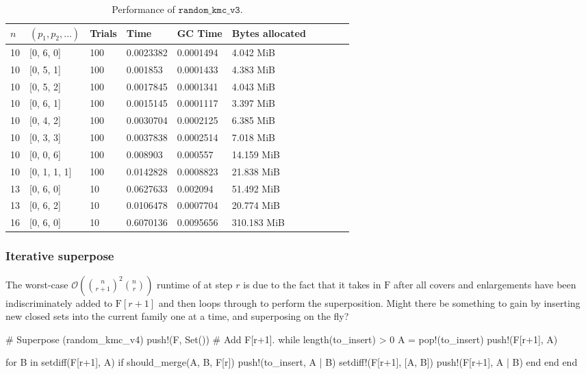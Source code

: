 \begin{table*}[ht!]
  \centering
  \caption{Performance of $\texttt{random\_kmc\_v3}$.}
  \label{tab:perf_v3}
  \begin{threeparttable}
    \begin{tabular}{llllllllll}
      \toprule
      $n$ & $(p_1, p_2, \ldots)$ & Trials & Time  & GC Time & Bytes allocated \\
      \midrule
      10 & [0, 6, 0] & 100 & 0.0023382 & 0.0001494 & 4.042 MiB \\
      10 & [0, 5, 1] & 100 & 0.001853 & 0.0001433 & 4.383 MiB \\
      10 & [0, 5, 2] & 100 & 0.0017845 & 0.0001341 & 4.043 MiB \\
      10 & [0, 6, 1] & 100 & 0.0015145 & 0.0001117 & 3.397 MiB \\
      10 & [0, 4, 2] & 100 & 0.0030704 & 0.0002125 & 6.385 MiB \\
      10 & [0, 3, 3] & 100 & 0.0037838 & 0.0002514 & 7.018 MiB \\
      10 & [0, 0, 6] & 100 & 0.008903 & 0.000557 & 14.159 MiB \\
      10 & [0, 1, 1, 1] & 100 & 0.0142828 & 0.0008823 & 21.838 MiB \\
      13 & [0, 6, 0] & 10 & 0.0627633 & 0.002094 & 51.492 MiB \\
      13 & [0, 6, 2] & 10 & 0.0106478 & 0.0007704 & 20.774 MiB \\
      16 & [0, 6, 0] & 10 & 0.6070136 & 0.0095656 & 310.183 MiB \\
      \bottomrule
    \end{tabular}
  \end{threeparttable}
\end{table*}


\subsubsection{Iterative superpose}
The worst-case $\mathcal{O}({\binom{n}{r+1}}^2{\binom{n}{r}})$ runtime of  at step $r$ is due to the fact that it takes in $\mathrm{F}$ after all covers and enlargements have been indiscriminately added to $\mathrm{F}[r+1]$ and then loops through to perform the superposition. Might there be something to gain by inserting new closed sets into the current family one at a time, and superposing on the fly?

\begin{jllisting}
  # Superpose (random_kmc_v4)
  push!(F, Set()) # Add F[r+1].
  while length(to_insert) > 0
    A = pop!(to_insert)
    push!(F[r+1], A)

    for B in setdiff(F[r+1], A)
      if should_merge(A, B, F[r])
        push!(to_insert, A | B)
        setdiff!(F[r+1], [A, B])
        push!(F[r+1], A | B)
      end
    end
  end
\end{jllisting}

